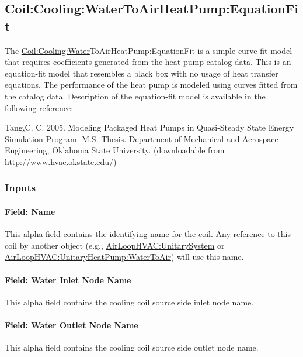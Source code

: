 \subsection{Coil:Cooling:WaterToAirHeatPump:EquationFit}\label{coilcoolingwatertoairheatpumpequationfit}

The \hyperref[coilcoolingwater]{Coil:Cooling:Water}ToAirHeatPump:EquationFit is a simple curve-fit model that requires coefficients generated from the heat pump catalog data. This is an equation-fit model that resembles a black box with no usage of heat transfer equations. The performance of the heat pump is modeled using curves fitted from the catalog data. Description of the equation-fit model is available in the following reference:

Tang,C. C. 2005. Modeling Packaged Heat Pumps in Quasi-Steady State Energy Simulation Program. M.S. Thesis. Department of Mechanical and Aerospace Engineering, Oklahoma State University. (downloadable from \href{http://www.hvac.okstate.edu}{http://www.hvac.okstate.edu/})

\subsubsection{Inputs}\label{inputs-30}

\paragraph{Field: Name}\label{field-name-29}

This alpha field contains the identifying name for the coil. Any reference to this coil by another object (e.g., \hyperref[airloophvacunitarysystem]{AirLoopHVAC:UnitarySystem} or \hyperref[airloophvacunitaryheatpumpwatertoair]{AirLoopHVAC:UnitaryHeatPump:WaterToAir}) will use this name.

\paragraph{Field: Water Inlet Node Name}\label{field-water-inlet-node-name-6-000}

This alpha field contains the cooling coil source side inlet node name.

\paragraph{Field: Water Outlet Node Name}\label{field-water-outlet-node-name-6-000}

This alpha field contains the cooling coil source side outlet node name.

